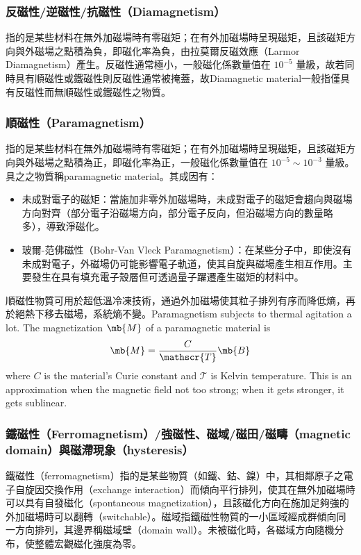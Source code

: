 \documentclass[a4paper,12pt]{report}
\begin{document}
\begin{itemize}
\subsubsection{反磁性/逆磁性/抗磁性（Diamagnetism）}
指的是某些材料在無外加磁場時有零磁矩；在有外加磁場時呈現磁矩，且該磁矩方向與外磁場之點積為負，即磁化率為負，由拉莫爾反磁效應（Larmor Diamagnetism）產生。反磁性通常極小，一般磁化係數量值在 $10^{-5}$ 量級，故若同時具有順磁性或鐵磁性則反磁性通常被掩蓋，故Diamagnetic material一般指僅具有反磁性而無順磁性或鐵磁性之物質。
\subsubsection{順磁性（Paramagnetism）}
指的是某些材料在無外加磁場時有零磁矩；在有外加磁場時呈現磁矩，且該磁矩方向與外磁場之點積為正，即磁化率為正，一般磁化係數量值在 $10^{-5}\sim 10^{-3}$ 量級。具之之物質稱paramagnetic material。其成因有：
\begin{itemize}
\item 未成對電子的磁矩：當施加非零外加磁場時，未成對電子的磁矩會趨向與磁場方向對齊（部分電子沿磁場方向，部分電子反向，但沿磁場方向的數量略多），導致淨磁化。
\item 玻爾-范佛磁性（Bohr-Van Vleck Paramagnetism）：在某些分子中，即使沒有未成對電子，外磁場仍可能影響電子軌道，使其自旋與磁場產生相互作用。主要發生在具有填充電子殼層但可透過量子躍遷產生磁矩的材料中。
\end{itemize}
順磁性物質可用於超低溫冷凍技術，通過外加磁場使其粒子排列有序而降低熵，再於絕熱下移去磁場，系統熵不變。Paramagnetism subjects to thermal agitation a lot.
The magnetization $\mb{M}$ of a paramagnetic material is
\[\mb{M}=\frac{C}{\mathscr{T}}\mb{B}\]
where $C$ is the material's Curie constant and $\mathscr{T}$ is Kelvin temperature. This is an approximation when the magnetic field not too strong; when it gets stronger, it gets sublinear.
\subsubsection{鐵磁性（Ferromagnetism）/強磁性、磁域/磁田/磁疇（magnetic domain）與磁滯現象（hysteresis）}
鐵磁性（ferromagnetism）指的是某些物質（如鐵、鈷、鎳）中，其相鄰原子之電子自旋因交換作用（exchange interaction）而傾向平行排列，使其在無外加磁場時可以具有自發磁化（spontaneous magnetization），且該磁化方向在施加足夠強的外加磁場時可以翻轉（switchable）。磁域指鐵磁性物質的一小區域經成群傾向同一方向排列，其邊界稱磁域壁（domain wall）。未被磁化時，各磁域方向隨機分布，使整體宏觀磁化強度為零。


\end{itemize}
\end{document}
